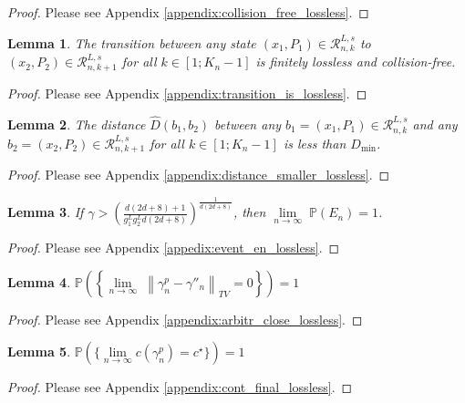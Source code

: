 \documentclass[Afour,sageh,times]{sagej}
\newtheorem{lemma}{\bf Lemma}
\begin{document}
\begin{proof}
    Please see Appendix \ref{appendix:collision_free_lossless}.
\end{proof}

\begin{lemma}
\normalfont The transition between any state $(x_1,P_1)\in\mathcal{R}^{L,s}_{n,k}$ to $(x_2,P_2)\in\mathcal{R}^{L,s}_{n,k+1}$ for all $k\in[1;K_n-1]$ is finitely lossless and collision-free.
\label{lemma:transition_is_lossless}
\end{lemma}
\begin{proof}
    Please see Appendix \ref{appendix:transition_is_lossless}.
\end{proof}

\begin{lemma}
\normalfont The distance $\hat{D}(b_1,b_2)$ between any $b_1=(x_1,P_1)\in\mathcal{R}^{L,s}_{n,k}$ and any $b_2=(x_2,P_2)\in\mathcal{R}^{L,s}_{n,k+1}$ for all $k\in[1;K_n-1]$ is less than $D_{\text{min}}$.
\label{lemma:distance_smaller_than_ed_min_lossless}
\end{lemma}
\begin{proof}
    Please see Appendix \ref{appendix:distance_smaller_lossless}.
\end{proof}


\begin{lemma}
\normalfont If
$\gamma>\left(\frac{d(2d+8)+1}{g^L_1 g^L_2 d(2d+8)} \right)^\frac{1}{d(2d+8)}$, 
then $\underset{n\rightarrow\infty}{\lim}\; \mathbb{P}\left(E_n \right)=1$.
\label{lemma:event_E_n_for_lossless}
\end{lemma}
\begin{proof}
    Please see Appendix \ref{appedix:event_en_lossless}.
\end{proof}


\begin{lemma}
$\mathbb{P}\left(\left\{\underset{n\rightarrow\infty}{\lim}\;\left\|\gamma^p_{n}-\gamma''_{n}\right\|_{TV}=0\right\}\right)=1$
\label{lemma:arbritrarily_close_for_lossless}
\end{lemma}
\begin{proof}
    Please see Appendix \ref{appendix:arbitr_close_lossless}.
\end{proof}
\begin{lemma}
   $ \mathbb{P}(\{\underset{n\rightarrow\infty}{\lim} c(\gamma^p_n)=c^\star\})=1$
\label{lemma:cont_final_lossless}
\end{lemma}
\begin{proof}
    Please see Appendix \ref{appendix:cont_final_lossless}.
\end{proof}
\end{document}
